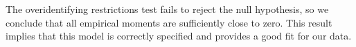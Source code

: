 \documentclass[11pt,letterpaper]{article}\usepackage[]{graphicx}\usepackage[]{color}
\begin{document}
\begin{enumerate}[label=\alph*., leftmargin=*]
\begin{enumerate}[label=\roman*.]
		The overidentifying restrictions test fails to reject the null hypothesis, so we conclude that all empirical moments are sufficiently close to zero. This result implies that this model is correctly specified and provides a good fit for our data.
	\end{enumerate}
\end{enumerate}
\end{document}
